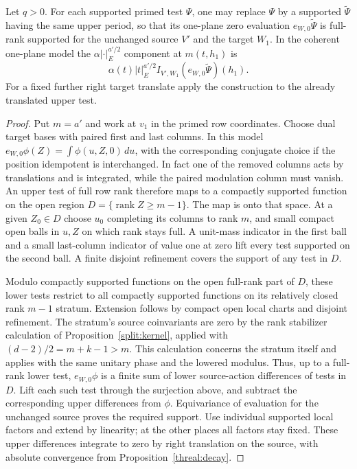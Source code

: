 \begin{lemma}
\label{tpd:so}
Let \(q>0\). For each supported primed test \(\Psi\), one may
replace \(\Psi\) by a supported \(\widetilde\Psi\) having the
same upper period, so that its one-plane zero evaluation
\(e_{W,0}\widetilde\Psi\) is full-rank supported for the unchanged
source \(V'\) and the target \(W_1\). In the coherent one-plane
model the \(\alpha|\cdot|_E^{a'/2}\) component at \(m(t,h_1)\)
is
\[
   \alpha(t)|t|_E^{a'/2}
       I_{V',W_1}(e_{W,0}\widetilde\Psi)(h_1).
\]
For a fixed further right target translate apply the construction
to the already translated upper test.
\end{lemma}
\begin{proof}
Put \(m=a'\) and work at \(v_1\) in the primed row coordinates.
Choose dual target bases with paired first and last columns. In
this model \(e_{W,0}\phi(Z)=\int\phi(u,Z,0)\,du\), with the
corresponding conjugate choice if the position idempotent is
interchanged. In fact one of the removed columns acts by translations
and is integrated, while the paired modulation column must vanish.
An upper test of full row rank therefore maps to a compactly
supported function on the open region \(D=\{\operatorname{rank}
Z\ge m-1\}\). The map is onto that space. At a given \(Z_0\in D\)
choose \(u_0\) completing its columns to rank \(m\), and small
compact open balls in \(u,Z\) on which rank stays full. A unit-mass
indicator in the first ball and a small last-column indicator of
value one at zero lift every test supported on the second ball.
A finite disjoint refinement covers the support of any test in \(D\).

Modulo compactly supported functions on the open full-rank part
of \(D\), these lower tests restrict to all compactly supported
functions on its relatively closed rank \(m-1\) stratum. Extension
follows by compact open local charts and disjoint refinement.
The stratum's source coinvariants are zero by the rank stabilizer
calculation of Proposition~\ref{split:kernel}, applied with
\((d-2)/2=m+k-1>m\). This calculation concerns the stratum itself
and applies with the same unitary phase and the lowered modulus.
Thus, up to a full-rank lower test, \(e_{W,0}\phi\) is a finite sum
of lower source-action differences of tests in \(D\). Lift each
such test through the surjection above, and subtract the
corresponding upper differences from \(\phi\). Equivariance of
evaluation for the unchanged source proves the required support.
Use individual supported local factors and extend by linearity;
at the other places all factors stay fixed. These upper differences
integrate to zero by right translation on the source, with absolute
convergence from Proposition~\ref{threal:decay}.


\end{proof}
